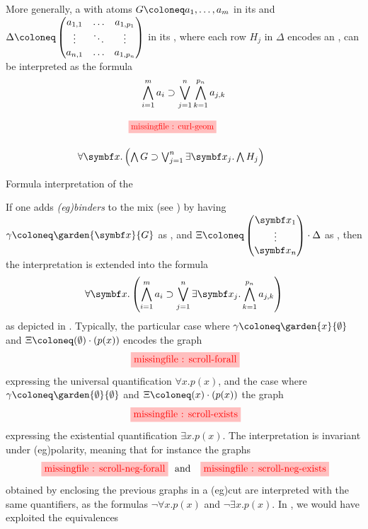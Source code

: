 \begin{scope}
More generally, a  with atoms $G \deq a_1, \ldots, a_m$ in its
 and $\Delta \deq \begin{pmatrix} a_{1,1} & \ldots & a_{1,p_1} \\
  \vdots & \ddots & \vdots \\
  a_{n,1} & \ldots & a_{1,p_n}
\end{pmatrix}$
in its , where each row $H_j$ in $\Delta$ encodes an , can be
interpreted as the formula
$$\bigwedge_{i = 1}^{m}{a_i} \supset \bigvee_{j = 1}^{n}\bigwedge_{k = 1}^{p_n}{a_{j,k}}$$
\begin{marginfigure}
  $$
  \hspace{-2.5em}
  \begin{array}{c}
    \tikzfig{0.85}{0.85}{curl-geom} \vspace{1.5em}\\
    \forall \bx. \left(\bigwedge G \limp \bigvee_{j = 1}^{n}\exists \bx_j. \bigwedge H_j\right)
  \end{array}
  $$
  \caption{Formula interpretation of the }
\end{marginfigure}
If one adds \emph{\kl(eg){binders}} to the mix (see ) by having $\gamma \deq
\garden{\bx}{G}$ as , and
$\Xi \deq \begin{pmatrix}
  \bx_1 \\
  \vdots \\
  \bx_n
\end{pmatrix} \cdot \Delta$ as , then the interpretation is extended into
the formula
$$\forall \bx. \left(\bigwedge_{i = 1}^{m}{a_i} \limp \bigvee_{j = 1}^{n}\exists \bx_j. \bigwedge_{k = 1}^{p_n}{a_{j,k}}\right)$$
as depicted in . Typically, the particular case where $\gamma
\deq \garden{x}{\emptyset}$ and $\Xi \deq (\emptyset) \cdot (p(x))$ encodes the graph
$$\stkfig{1}{scroll-forall}$$
expressing the universal quantification $\forall x. p(x)$, and the case where
$\gamma \deq \garden{\emptyset}{\emptyset}$ and $\Xi \deq (x) \cdot (p(x))$ the graph
$$\stkfig{1}{scroll-exists}$$
expressing the existential quantification $\exists x. p(x)$. The interpretation
is invariant under \kl(eg){polarity}, meaning that for instance the graphs
$$\stkfig{1}{scroll-neg-forall} \text{   and   } \stkfig{1}{scroll-neg-exists}$$
obtained by enclosing the previous graphs in a \kl(eg){cut} are interpreted with the
same quantifiers, as the formulas $\neg \forall x. p(x)$ and $\neg \exists x.
p(x)$. In , we would have exploited the  equivalences

\end{scope}
